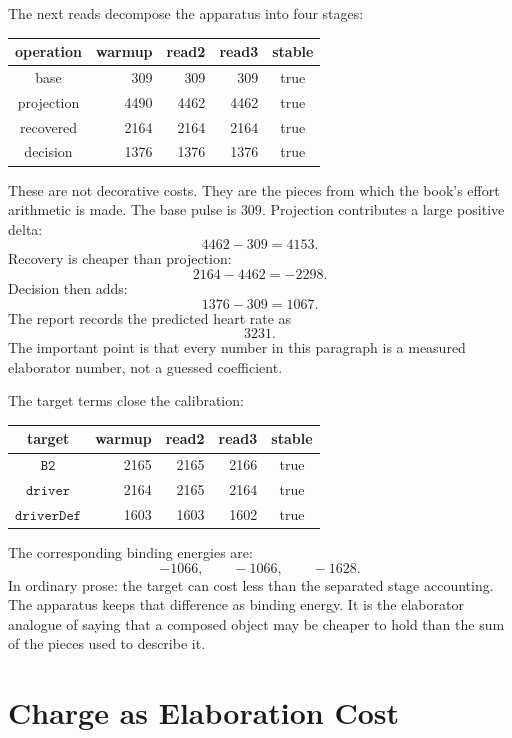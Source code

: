 The next reads decompose the apparatus into four stages:
\begin{center}\small
\begin{tabular}{c|r|r|r|c}
operation & warmup & read2 & read3 & stable\\
\hline
base & 309 & 309 & 309 & true\\
projection & 4490 & 4462 & 4462 & true\\
recovered & 2164 & 2164 & 2164 & true\\
decision & 1376 & 1376 & 1376 & true
\end{tabular}
\end{center}
These are not decorative costs. They are the pieces from which the book's effort arithmetic is made. The base
pulse is \(309\). Projection contributes a large positive delta:
\[
  4462 - 309 = 4153.
\]
Recovery is cheaper than projection:
\[
  2164 - 4462 = -2298.
\]
Decision then adds:
\[
  1376 - 309 = 1067.
\]
The report records the predicted heart rate as
\[
  3231.
\]
The important point is that every number in this paragraph is a measured elaborator number, not a guessed
coefficient.

The target terms close the calibration:
\begin{center}\small
\begin{tabular}{c|r|r|r|c}
target & warmup & read2 & read3 & stable\\
\hline
\(\texttt{B2}\) & 2165 & 2165 & 2166 & true\\
\(\texttt{driver}\) & 2164 & 2165 & 2164 & true\\
\(\texttt{driverDef}\) & 1603 & 1603 & 1602 & true
\end{tabular}
\end{center}
The corresponding binding energies are:
\[
  -1066,\qquad -1066,\qquad -1628.
\]
In ordinary prose: the target can cost less than the separated stage accounting. The apparatus keeps that
difference as binding energy. It is the elaborator analogue of saying that a composed object may be cheaper to
hold than the sum of the pieces used to describe it.

\section{Charge as Elaboration Cost}

